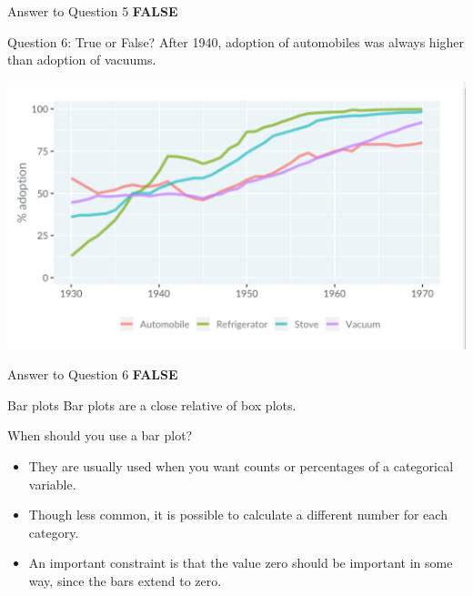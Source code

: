 \documentclass[
  ignorenonframetext,
]{beamer}
\begin{document}
\begin{frame}{Answer to Question 5}
\label{answer-to-question-5-1}
\textbf{FALSE}
\end{frame}

\begin{frame}{Question 6: True or False?}
\label{question-6-true-or-false-1}
After 1940, adoption of automobiles was always higher than adoption of
vacuums.

\includegraphics{../images/im48.png}
\end{frame}

\begin{frame}{Answer to Question 6}
\label{answer-to-question-6-1}
\textbf{FALSE}
\end{frame}

\begin{frame}{Bar plots}
\label{bar-plots}
Bar plots are a close relative of box plots.
\end{frame}

\begin{frame}{When should you use a bar plot?}
\label{when-should-you-use-a-bar-plot}
\begin{itemize}
\item
  They are usually used when you want counts or percentages of a
  categorical variable.
\item
  Though less common, it is possible to calculate a different number for
  each category.
\item
  An important constraint is that the value zero should be important in
  some way, since the bars extend to zero.
\end{itemize}
\end{frame}
\end{document}
